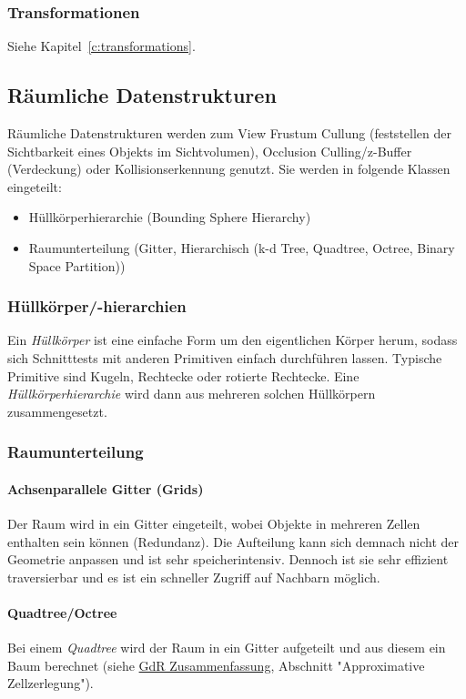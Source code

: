 			\subsubsection{Transformationen}
				Siehe Kapitel~\ref{c:transformations}.

		\subsection{Räumliche Datenstrukturen}
			Räumliche Datenstrukturen werden \bspw zum View Frustum Cullung (feststellen der Sichtbarkeit eines Objekts im Sichtvolumen), Occlusion Culling/z-Buffer (Verdeckung) oder Kollisionserkennung genutzt. Sie werden in folgende Klassen eingeteilt:
			\begin{itemize}
				\item Hüllkörperhierarchie (\bspw Bounding Sphere Hierarchy)
				\item Raumunterteilung (Gitter, Hierarchisch (k-d Tree, Quadtree, Octree, Binary Space Partition))
			\end{itemize}

			\subsubsection{Hüllkörper/-hierarchien}
				Ein \emph{Hüllkörper} ist eine einfache Form um den eigentlichen Körper herum, sodass sich Schnitttests mit anderen Primitiven einfach durchführen lassen. Typische Primitive sind \zB Kugeln, Rechtecke oder rotierte Rechtecke. Eine \emph{Hüllkörperhierarchie} wird dann aus mehreren solchen Hüllkörpern zusammengesetzt.

			\subsubsection{Raumunterteilung}
				\paragraph{Achsenparallele Gitter (Grids)}
					Der Raum wird in ein Gitter eingeteilt, wobei Objekte in mehreren Zellen enthalten sein können (Redundanz). Die Aufteilung kann sich demnach nicht der Geometrie anpassen und ist sehr speicherintensiv. Dennoch ist sie sehr effizient traversierbar und es ist ein schneller Zugriff auf Nachbarn möglich.

				\paragraph{Quadtree/Octree}
					Bei einem \emph{Quadtree} wird der Raum in ein Gitter aufgeteilt und aus diesem ein Baum berechnet (siehe \href{https://projects.frisp.org/documents/29}{GdR Zusammenfassung}, Abschnitt "Approximative Zellzerlegung").
					

